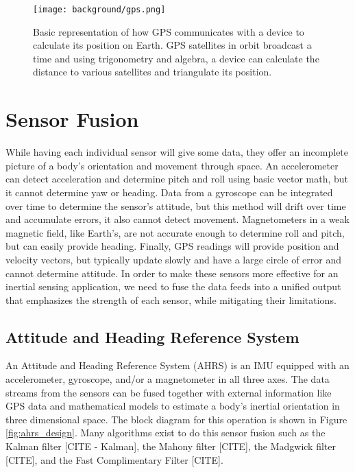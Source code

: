 \begin{figure}[h!]
    \caption[GPS diagram]{Basic representation of how GPS communicates with a device to calculate its position on Earth.
    GPS satellites in orbit broadcast a time and using trigonometry and algebra, a device can calculate the distance to various satellites and triangulate its position.}
    \label{fig:gps}
    \centering
    \texttt{[image: background/gps.png]}
\end{figure}

\section{Sensor Fusion} \label{sec:sensor_fusion}
While having each individual sensor will give some data, they offer an incomplete picture of a body's orientation and movement through space.
An accelerometer can detect acceleration and determine pitch and roll using basic vector math, but it cannot determine yaw or heading.
Data from a gyroscope can be integrated over time to determine the sensor's attitude, but this method will drift over time and accumulate errors, it also cannot detect movement.
Magnetometers in a weak magnetic field, like Earth's, are not accurate enough to determine roll and pitch, but can easily provide heading.
Finally, GPS readings will provide position and velocity vectors, but typically update slowly and have a large circle of error and cannot determine attitude.
In order to make these sensors more effective for an inertial sensing application, we need to fuse the data feeds into a unified output that emphasizes the strength of each sensor, while mitigating their limitations.

\subsection{Attitude and Heading Reference System} \label{ssec:ahrs}
An Attitude and Heading Reference System (AHRS) is an IMU equipped with an accelerometer, gyroscope, and/or a magnetometer in all three axes.
The data streams from the sensors can be fused together with external information like GPS data and mathematical models to estimate a body's inertial orientation in three dimensional space.
The block diagram for this operation is shown in Figure \ref{fig:ahrs_design}.
Many algorithms exist to do this sensor fusion such as the Kalman filter [CITE - Kalman], the Mahony filter [CITE], the Madgwick filter [CITE], and the Fast Complimentary Filter [CITE].

